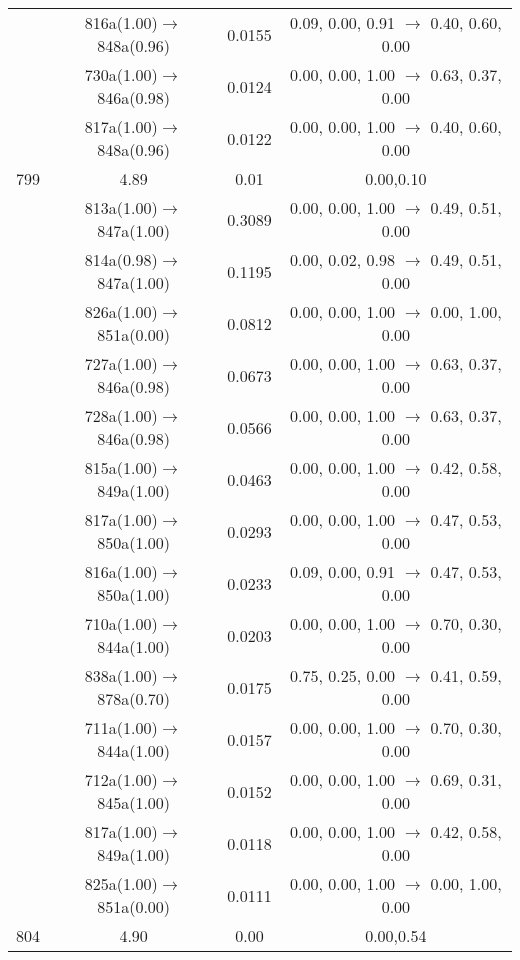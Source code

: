 \documentclass[10pt,a4paper]{article}
\begin{document}
\begin{longtable}{c|c|c|c}
 	& 816a(1.00)$\rightarrow$848a(0.96) &	 0.0155 &	 0.09, 0.00, 0.91 $\rightarrow$ 0.40, 0.60, 0.00 \\ 
 	& 730a(1.00)$\rightarrow$846a(0.98) &	 0.0124 &	 0.00, 0.00, 1.00 $\rightarrow$ 0.63, 0.37, 0.00 \\ 
 	& 817a(1.00)$\rightarrow$848a(0.96) &	 0.0122 &	 0.00, 0.00, 1.00 $\rightarrow$ 0.40, 0.60, 0.00 \\ 
 \hline799 &	 4.89 &	 0.01 &	 0.00,0.10 \\ 
  	& 813a(1.00)$\rightarrow$847a(1.00) &	 0.3089 &	 0.00, 0.00, 1.00 $\rightarrow$ 0.49, 0.51, 0.00 \\ 
 	& 814a(0.98)$\rightarrow$847a(1.00) &	 0.1195 &	 0.00, 0.02, 0.98 $\rightarrow$ 0.49, 0.51, 0.00 \\ 
 	& 826a(1.00)$\rightarrow$851a(0.00) &	 0.0812 &	 0.00, 0.00, 1.00 $\rightarrow$ 0.00, 1.00, 0.00 \\ 
 	& 727a(1.00)$\rightarrow$846a(0.98) &	 0.0673 &	 0.00, 0.00, 1.00 $\rightarrow$ 0.63, 0.37, 0.00 \\ 
 	& 728a(1.00)$\rightarrow$846a(0.98) &	 0.0566 &	 0.00, 0.00, 1.00 $\rightarrow$ 0.63, 0.37, 0.00 \\ 
 	& 815a(1.00)$\rightarrow$849a(1.00) &	 0.0463 &	 0.00, 0.00, 1.00 $\rightarrow$ 0.42, 0.58, 0.00 \\ 
 	& 817a(1.00)$\rightarrow$850a(1.00) &	 0.0293 &	 0.00, 0.00, 1.00 $\rightarrow$ 0.47, 0.53, 0.00 \\ 
 	& 816a(1.00)$\rightarrow$850a(1.00) &	 0.0233 &	 0.09, 0.00, 0.91 $\rightarrow$ 0.47, 0.53, 0.00 \\ 
 	& 710a(1.00)$\rightarrow$844a(1.00) &	 0.0203 &	 0.00, 0.00, 1.00 $\rightarrow$ 0.70, 0.30, 0.00 \\ 
 	& 838a(1.00)$\rightarrow$878a(0.70) &	 0.0175 &	 0.75, 0.25, 0.00 $\rightarrow$ 0.41, 0.59, 0.00 \\ 
 	& 711a(1.00)$\rightarrow$844a(1.00) &	 0.0157 &	 0.00, 0.00, 1.00 $\rightarrow$ 0.70, 0.30, 0.00 \\ 
 	& 712a(1.00)$\rightarrow$845a(1.00) &	 0.0152 &	 0.00, 0.00, 1.00 $\rightarrow$ 0.69, 0.31, 0.00 \\ 
 	& 817a(1.00)$\rightarrow$849a(1.00) &	 0.0118 &	 0.00, 0.00, 1.00 $\rightarrow$ 0.42, 0.58, 0.00 \\ 
 	& 825a(1.00)$\rightarrow$851a(0.00) &	 0.0111 &	 0.00, 0.00, 1.00 $\rightarrow$ 0.00, 1.00, 0.00 \\ 
 \hline804 &	 4.90 &	 0.00 &	 0.00,0.54 \\ 

\end{longtable}
\end{document}
